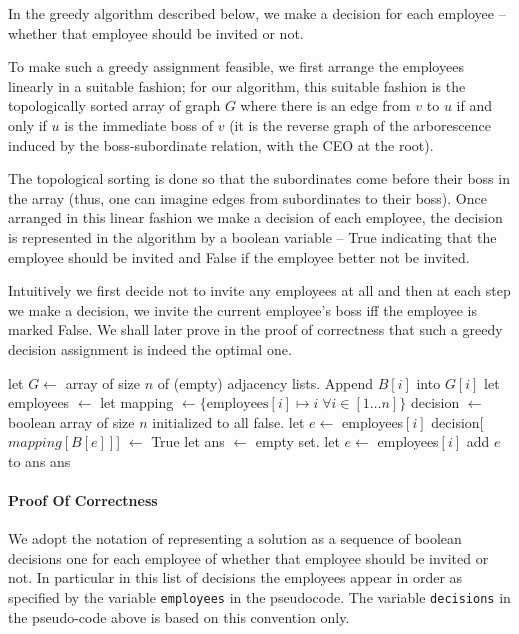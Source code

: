 \documentclass[answers]{exam}
\begin{document}
\begin{questions}
\begin{solution}
In the greedy algorithm described below, we make a decision for each employee -- whether that employee should be invited or not.

To make such a greedy assignment feasible, we first arrange the employees linearly in a suitable fashion; for our algorithm, this suitable fashion is the topologically sorted array of graph $G$ where there is an edge from $v$ to $u$ if and only if $u$ is the immediate boss of $v$ (it is the reverse graph of the arborescence induced by the boss-subordinate relation, with the CEO at the root).%

The topological sorting is done so that the subordinates come before their boss in the array (thus, one can imagine edges from subordinates to their boss). Once arranged in this linear fashion we make a decision of each employee, the decision is represented in the algorithm by a boolean variable -- True indicating that the employee should be invited and False if the employee better not be invited.

Intuitively we first decide not to invite any employees at all and then at each step we make a decision, we invite the current employee's boss iff the employee is marked False. We shall later prove in the proof of correctness that such a greedy decision assignment is indeed the optimal one.

\begin{algorithmic}[1]
        \State let $G \gets$ array of size $n$ of (empty) adjacency lists.
            \State Append $B[i]$ into $G[i]$ 
        \EndFor
        \State let employees $\gets$ 
        \State let mapping $\gets \{ \text{employees}[i] \mapsto i \; \forall i \in [1 \ldots n] \}$
        \State decision $\gets$ boolean array of size $n$ initialized to all false.
            \State let $e \gets$ employees$[i]$
                \State decision[$mapping[B[e]]$] $\gets$ True
            \EndIf
        \EndFor
        \State let ans $\gets$ empty set.
            \State let $e \gets$ employees$[i]$
                \State add $e$ to ans
            \EndIf
        \EndFor
        \State \Return ans
    \EndFunction
\end{algorithmic}

\paragraph{Proof Of Correctness}
We adopt the notation of representing a solution as a sequence of boolean decisions one for each employee of whether that employee should be invited or not. In particular in this list of decisions the employees appear in order as specified by the variable \texttt{employees} in the pseudocode. The variable \texttt{decisions} in the pseudo-code above is based on this convention only.


\end{solution}
\end{questions}
\end{document}
